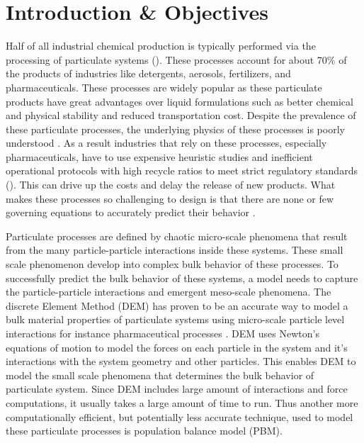 \documentclass[preprint,11pt,authoryear]{elsarticle}
\begin{document}
\section{Introduction \& Objectives} 
Half of all industrial chemical production is typically performed via the 
processing of particulate systems
(\cite{seville1997}). These processes account for about 70\% of the products 
of industries like detergents, aerosols, fertilizers, and pharmaceuticals\citep{Litster2016}. 
These processes are widely popular as these particulate products have great advantages over 
liquid formulations such as better chemical and physical stability and reduced 
transportation cost. Despite the prevalence of these particulate processes, the underlying 
physics of these processes is poorly understood \citep{Rogers2013}. As a result industries 
that rely on these processes, especially pharmaceuticals, have to use expensive 
heuristic studies and inefficient operational protocols with high recycle ratios to meet strict 
regulatory standards (\cite{Ramachandran2009}). This can drive up the costs and delay the release of 
new products. What makes these processes so challenging to design is that there are none or few governing 
equations to accurately predict their behavior \citep{sen2013}.

Particulate processes are defined by chaotic micro-scale phenomena that result from the many 
particle-particle interactions inside these systems. These small scale phenomenon develop into 
complex bulk behavior of these processes. To successfully predict the bulk behavior of these 
systems, a model needs to capture the particle-particle interactions and emergent meso-scale phenomena. 
The discrete Element Method (DEM)\citep{Cundall1979} has proven to be an accurate way 
to  model a bulk material properties of particulate systems using micro-scale particle level 
interactions for instance pharmaceutical processes \citep{Hancock2011}. DEM uses Newton's equations of 
motion to model the forces on each particle in the system and it's interactions with the system 
geometry and other particles. This enables DEM to model the small scale phenomena that 
determines the bulk behavior of particulate system. Since DEM includes large amount of interactions
and force computations, it usually takes a large amount of time to run. Thus another more computationally 
efficient, but potentially less accurate technique, used to model these particulate processes is population 
balance model (PBM). %
\end{document}
